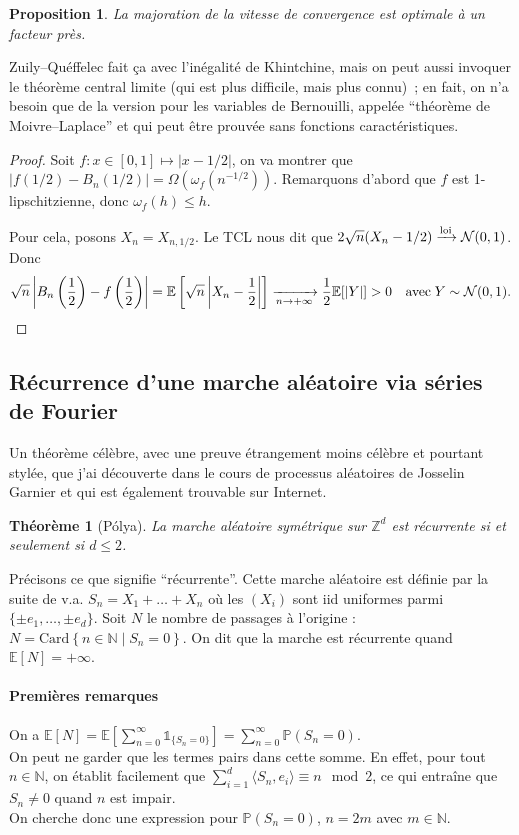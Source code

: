 \documentclass[a4paper, 11pt]{article}
\def\Z{\mathbb{Z}}
\def\N{\mathbb{N}}
\def\P{\mathbb{P}}
\def\E{\mathbb{E}}
\def\Indic{\mathbb{1}}
\newtheorem*{proposition}{Proposition}
\newtheorem*{theorem}{Théorème}
\begin{document}
\begin{proposition}
  La majoration de la vitesse de convergence est optimale à un facteur près.
\end{proposition}
Zuily--Quéffelec fait ça avec l'inégalité de Khintchine, mais on peut aussi
invoquer le théorème central limite (qui est plus difficile, mais plus connu)~;
en fait, on n'a besoin que de la version pour les variables de Bernouilli,
appelée \enquote{théorème de Moivre--Laplace} et qui peut être prouvée sans
fonctions caractéristiques.
\begin{proof}
  Soit $f : x \in [0,1] \mapsto |x - 1/2|$, on va montrer que $|f(1/2) -
  B_n(1/2)| = \Omega(\omega_f(n^{-1/2}))$. Remarquons d'abord que $f$ est
  1-lipschitzienne, donc $\omega_f(h) \leq h$.

  Pour cela, posons $X_n = X_{n,1/2}$.
  Le TCL nous dit que $2\sqrt{n}(X_n - 1/2)
  \xrightarrow{\textnormal{loi}} \mathcal{N}(0,1)$. Donc
  \[ \sqrt{n} \left| B_n\left( \frac{1}{2} \right) - f\left( \frac{1}{2} \right)
    \right| = \E\left[ \sqrt{n} \left| X_n - \frac{1}{2} \right| \right]
    \xrightarrow[n \to +\infty]{} \frac{1}{2} \E[|Y|] > 0 \quad
    \textnormal{avec}\; Y \sim \mathcal{N}(0,1).
  \]
\end{proof}

\newpage


\subsection{Récurrence d'une marche aléatoire via séries de Fourier}

Un théorème célèbre, avec une preuve étrangement moins célèbre et pourtant
stylée, que j'ai découverte dans le cours de processus aléatoires de Josselin
Garnier et qui est également trouvable sur Internet.

\begin{theorem}[Pólya]
  La marche aléatoire symétrique sur $\Z^d$ est \emph{récurrente} si et
  seulement si $d \leq 2$.
\end{theorem}

Précisons ce que signifie \enquote{récurrente}. Cette marche aléatoire est
définie par la suite de v.a. $S_n = X_1 + \ldots + X_n$ où les $(X_i)$ sont iid
uniformes parmi $\{\pm e_1, \ldots, \pm e_d\}$. Soit $N$ le nombre de passages à
l'origine : $N = \mathrm{Card}\left\{n \in \N \mid S_n = 0\right\}$. On dit que
la marche est récurrente quand $\E[N] = +\infty$.


\paragraph{Premières remarques} On a $\displaystyle \E[N] = \E\left[
  \sum_{n=0}^\infty \Indic_{\{S_n = 0\}} \right] =
\sum_{n=0}^\infty \P(S_n = 0)$.\\
On peut ne garder que les termes pairs dans cette somme. En effet, pour tout $n
\in \N$, on établit facilement que $\sum_{i=1}^d \langle S_n, e_i \rangle \equiv
n \mod 2$, ce qui entraîne que $S_n \neq 0$ quand $n$ est impair.\\
On cherche donc une expression pour $\P(S_n = 0)$, $n = 2m$ avec $m \in \N$.
\end{document}

